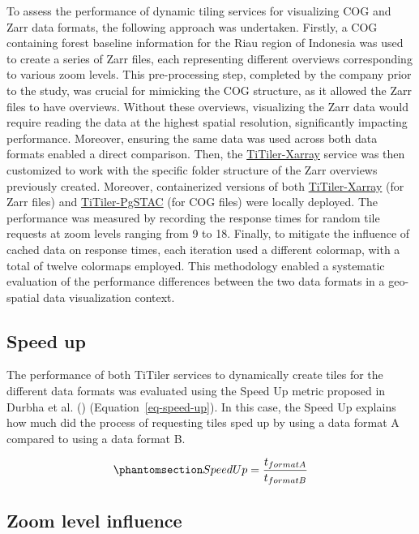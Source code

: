\documentclass[
  oneside,
  open=any]{scrbook}
\begin{document}
To assess the performance of dynamic tiling services for visualizing COG
and Zarr data formats, the following approach was undertaken. Firstly, a
COG containing forest baseline information for the Riau region of
Indonesia was used to create a series of Zarr files, each representing
different overviews corresponding to various zoom levels. This
pre-processing step, completed by the company prior to the study, was
crucial for mimicking the COG structure, as it allowed the Zarr files to
have overviews. Without these overviews, visualizing the Zarr data would
require reading the data at the highest spatial resolution,
significantly impacting performance. Moreover, ensuring the same data
was used across both data formats enabled a direct comparison. Then, the
\href{https://github.com/developmentseed/titiler-xarray}{TiTiler-Xarray}
service was then customized to work with the specific folder structure
of the Zarr overviews previously created. Moreover, containerized
versions of both
\href{https://github.com/developmentseed/titiler-xarray}{TiTiler-Xarray}
(for Zarr files) and
\href{https://github.com/stac-utils/titiler-pgstac}{TiTiler-PgSTAC} (for
COG files) were locally deployed. The performance was measured by
recording the response times for random tile requests at zoom levels
ranging from 9 to 18. Finally, to mitigate the influence of cached data
on response times, each iteration used a different colormap, with a
total of twelve colormaps employed. This methodology enabled a
systematic evaluation of the performance differences between the two
data formats in a geo-spatial data visualization context.

\subsection{Speed up}\label{speed-up}

The performance of both TiTiler services to dynamically create tiles for
the different data formats was evaluated using the Speed Up metric
proposed in Durbha et al. ()
(Equation~\ref{eq-speed-up}). In this case, the Speed Up explains how
much did the process of requesting tiles sped up by using a data format
A compared to using a data format B.

\begin{equation}\phantomsection\label{eq-speed-up}{ SpeedUp = \frac{t_{format A}}{t_{format B}} }\end{equation}

\subsection{Zoom level influence}\label{zoom-level-influence}
\end{document}
